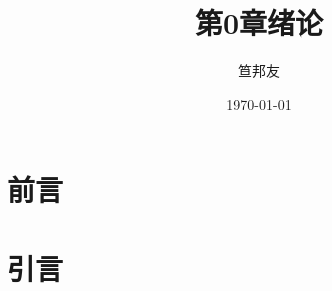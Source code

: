 \documentclass[notheorems,compress,mathserif,table]{beamer}
\title{\heiti 第0章\quad 绪论}
\author[\textcolor{blue}]{{\sihao\kaishu  笪邦友}}
\institute{\sihao\lishu  \textcolor{violet}{中南民族大学~~ 电子信息工程学院}}
\date{\fangsong\today}
\begin{document}
\kaishu
\frame{ \titlepage }
\section*{前言}


\section{引言}
\end{document}
